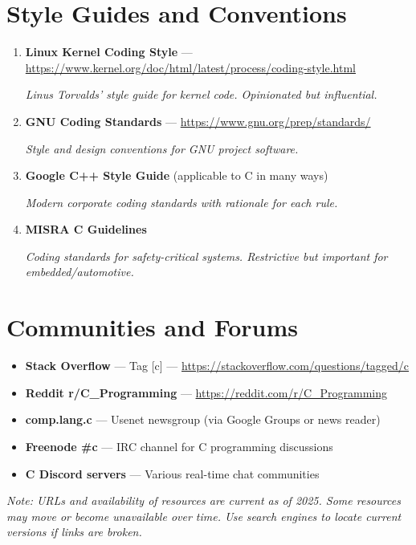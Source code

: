 \documentclass[11pt,openany]{book}
\begin{document}
\section*{Style Guides and Conventions}

\begin{enumerate}
    \item \textbf{Linux Kernel Coding Style} — \url{https://www.kernel.org/doc/html/latest/process/coding-style.html}

    \textit{Linus Torvalds' style guide for kernel code. Opinionated but influential.}

    \item \textbf{GNU Coding Standards} — \url{https://www.gnu.org/prep/standards/}

    \textit{Style and design conventions for GNU project software.}

    \item \textbf{Google C++ Style Guide} (applicable to C in many ways)

    \textit{Modern corporate coding standards with rationale for each rule.}

    \item \textbf{MISRA C Guidelines}

    \textit{Coding standards for safety-critical systems. Restrictive but important for embedded/automotive.}
\end{enumerate}

\section*{Communities and Forums}

\begin{itemize}
    \item \textbf{Stack Overflow} — Tag [c] — \url{https://stackoverflow.com/questions/tagged/c}
    \item \textbf{Reddit r/C\_Programming} — \url{https://reddit.com/r/C_Programming}
    \item \textbf{comp.lang.c} — Usenet newsgroup (via Google Groups or news reader)
    \item \textbf{Freenode \#c} — IRC channel for C programming discussions
    \item \textbf{C Discord servers} — Various real-time chat communities
\end{itemize}

\vspace{2em}

\textit{Note: URLs and availability of resources are current as of 2025. Some resources may move or become unavailable over time. Use search engines to locate current versions if links are broken.}
\end{document}
